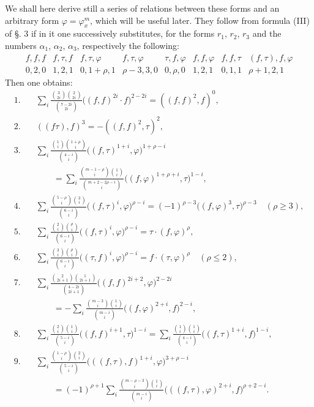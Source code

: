 \documentclass[10pt]{article}
\begin{document}
We shall here derive still a series of relations between these forms and an arbitrary form $\varphi=\varphi_x^m$, which will be useful later. They follow from formula (III) of §. 3 if in it one successively substitutes, for the forms $r_1$, $r_2$, $r_3$ and the numbers $\alpha_1$, $\alpha_2$, $\alpha_3$, respectively the following:
\[
\begin{array}{ccccccccc}
f,f,f&f,\tau,f&f,\tau,\varphi&f,\tau,\varphi&\tau,f,\varphi&f,f,\varphi&f,f,\tau&(f,\tau),f,\varphi\\
0,2,0&1,2,1&0,1+\rho,1&\rho-3,3,0&0,\rho,0&1,2,1&0,1,1&\rho+1,2,1
\end{array}
\]
Then one obtains:
\begin{align*}
1.\quad &\sum_i\frac{\binom{3}{2i}\binom{2}{2i}}{\binom{7-2i}{2i}}\bigl((f,f)^{2i}\cdot f\bigr)^{2-2i}=((f,f)^2,f)^0,\\
2.\quad &((f\tau),f)^3=-((f,f)^2,\tau)^2,\\
3.\quad &\sum_i\frac{\binom{1}{i}\binom{1+\rho}{i}}{\binom{4-i}{i}}\bigl((f,\tau)^{1+i},\varphi\bigr)^{1+\rho-i}\\
&\qquad=\sum_i\frac{\binom{m-1-\rho}{i}\binom{1}{i}}{\binom{m+2-2\rho-i}{i}}\bigl((f,\varphi)^{1+\rho+i},\tau\bigr)^{1-i},\\
4.\quad &\sum_i\frac{\binom{5-\rho}{i}\binom{3}{i}}{\binom{6-i}{i}}\bigl((f,\tau)^i,\varphi\bigr)^{\rho-i}=(-1)^{\rho-3}\bigl((f,\varphi)^3,\tau\bigr)^{\rho-3}\quad(\rho\geq 3),\\
5.\quad &\sum_i\frac{\binom{2}{i}\binom{\rho}{i}}{\binom{6-i}{i}}\bigl((f,\tau)^i,\varphi\bigr)^{\rho-i}=\tau\cdot(f,\varphi)^\rho,\\
6.\quad &\sum_i\frac{\binom{3}{i}\binom{\rho}{i}}{\binom{6-i}{i}}\bigl((\tau,f)^i,\varphi\bigr)^{\rho-i}=f\cdot(\tau,\varphi)^\rho\quad(\rho\leq 2),\\
7.\quad &\sum_i\frac{\binom{2}{2i+1}\binom{1}{2i+1}}{\binom{4-2i}{2i+1}}\bigl((f,f)^{2i+2},\varphi\bigr)^{2-2i}\\
&\qquad=-\sum_i\frac{\binom{m-3}{i}\binom{1}{i}}{\binom{m-i}{i}}\bigl((f,\varphi)^{2+i},f\bigr)^{2-i},\\
8.\quad &\sum_i\frac{\binom{2}{i}\binom{1}{i}}{\binom{5-i}{i}}\bigl((f,f)^{i+1},\tau\bigr)^{1-i}
=\sum_i\frac{\binom{1}{i}\binom{1}{i}}{\binom{4-i}{i}}\bigl((f,\tau)^{1+i},f\bigr)^{1-i},\\
9.\quad &\sum_i\frac{\binom{1-\rho}{i}\binom{2}{i}}{\binom{5-i}{i}}\bigl(((f,\tau),f)^{1+i},\varphi\bigr)^{3+\rho-i}\\
&\qquad=(-1)^{\rho+1}\sum_i\frac{\binom{m-\rho-3}{i}\binom{1}{i}}{\binom{m-i}{i}}\bigl(((f,\tau),\varphi)^{2+i},f\bigr)^{\rho+2-i}.
\end{align*}
\end{document}
